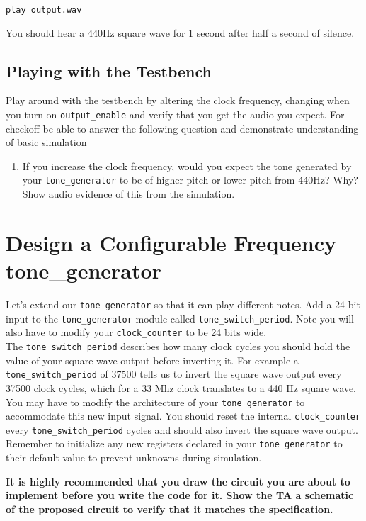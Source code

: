 \documentclass[11pt]{article}
\begin{document}
\verb|play output.wav|

You should hear a 440Hz square wave for 1 second after half a second of silence.

\subsection{Playing with the Testbench}

Play around with the testbench by altering the clock frequency, changing when you turn on \verb|output_enable| and verify that you get the audio you expect. For checkoff be able to answer the following question and demonstrate understanding of basic simulation

\begin{enumerate}
	\item If you increase the clock frequency, would you expect the tone generated by your \verb|tone_generator| to be of higher pitch or lower pitch from 440Hz? Why? Show audio evidence of this from the simulation.
\end{enumerate}

\section{Design a Configurable Frequency tone\_generator}

Let's extend our \verb|tone_generator| so that it can play different notes. Add a 24-bit input to the \verb|tone_generator| module called \verb|tone_switch_period|. Note you will also have to modify your \verb|clock_counter| to be 24 bits wide.\\

The \verb|tone_switch_period| describes how many clock cycles you should hold the value of your square wave output before inverting it. For example a \verb|tone_switch_period| of 37500 tells us to invert the square wave output every 37500 clock cycles, which for a 33 Mhz clock translates to a 440 Hz square wave.\\

You may have to modify the architecture of your \verb|tone_generator| to accommodate this new input signal. You should reset the internal \verb|clock_counter| every \verb|tone_switch_period| cycles and should also invert the square wave output. Remember to initialize any new registers declared in your \verb|tone_generator| to their default value to prevent unknowns during simulation.

\textbf{It is highly recommended that you draw the circuit you are about to implement before you write the code for it. Show the TA a schematic of the proposed circuit to verify that it matches the specification.}
\end{document}
